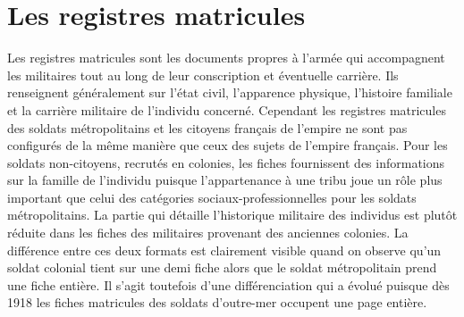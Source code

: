 \section{Les registres matricules}
Les registres matricules sont les documents propres à l’armée qui accompagnent les militaires tout au long de leur conscription et éventuelle carrière. Ils renseignent généralement sur l’état civil, l’apparence physique, l’histoire familiale et la carrière militaire de l’individu concerné. Cependant les registres matricules des soldats métropolitains et les citoyens français de l’empire ne sont pas configurés de la même manière  que ceux des sujets de l’empire français. Pour les soldats non-citoyens, recrutés en colonies, les fiches fournissent des informations sur la famille de l’individu puisque l’appartenance à une tribu joue un rôle plus important que celui des catégories sociaux-professionnelles pour les soldats métropolitains. La partie qui détaille l’historique militaire des individus est plutôt réduite dans les fiches des militaires provenant des anciennes colonies. La différence entre ces deux formats est clairement visible quand on observe qu’un soldat colonial tient sur une demi fiche alors que le soldat métropolitain prend une fiche entière. Il s’agit toutefois d’une différenciation qui a évolué puisque  dès 1918 les fiches matricules des soldats d’outre-mer occupent une page entière.  


